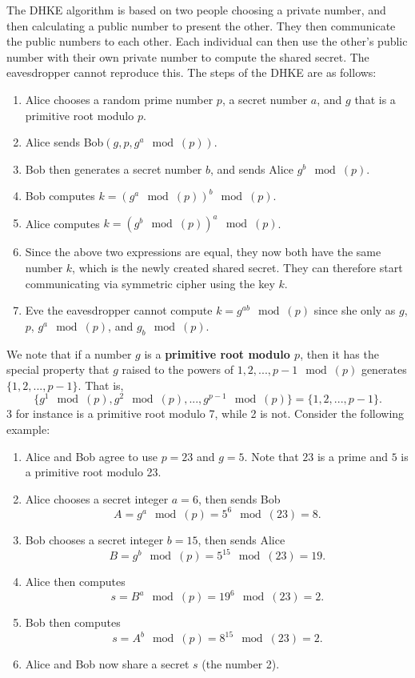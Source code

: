 \documentclass[11pt]{article}
\theoremstyle{plain} %
\theoremstyle{definition}
\theoremstyle{example}
\theoremstyle{remark}
\begin{document}
The DHKE algorithm is based on two people choosing a private number, and then calculating a public number to present the other. They then communicate the public numbers to each other. Each individual can then use the other's  public number with their own private number to compute the shared secret. The eavesdropper cannot reproduce this. The steps of the DHKE are as follows:
\begin{enumerate}
	\item Alice chooses a random prime number $p$, a secret number $a$, and $g$ that is a primitive root modulo $p$. 
	\item Alice sends Bob$ \left(g, p, g^a\mod(p)\right)$. 
	\item Bob then generates a secret number $b$, and sends Alice $g^b\mod(p)$. 
	\item Bob computes $k = \left(g^a\mod(p)\right)^b\mod(p)$.
	\item Alice computes $k = \left(g^b\mod(p)\right)^a\mod(p)$. 
	\item Since the above two expressions are equal, they now both have the same number $k$, which is the newly created shared secret. They can therefore start communicating via symmetric cipher using the key $k$. 
	\item Eve the eavesdropper cannot compute $k= g^{ab}\mod(p)$ since she only as $g$, $p$, $g^a\mod(p)$, and $g_b\mod(p)$. 
\end{enumerate}

We note that if a number $g$ is a \textbf{primitive root modulo $p$}, then it has the special property that $g$ raised to the powers of $1, 2, ..., p-1 \mod(p)$ generates $\{1, 2, ..., p-1\}$. That is, 
$$\{g^1\mod(p), g^2\mod(p) , ..., g^{p-1}\mod(p)\} = \{1, 2, ..., p-1\}.$$
3 for instance is a primitive root modulo 7, while 2 is not. Consider the following example:
\begin{enumerate}
	\item Alice and Bob agree to use $p = 23$ and $g = 5$. Note that $23$ is a prime and $5$ is a primitive root modulo 23. 
	\item Alice chooses a secret integer $a=6$, then sends Bob 
	$$A = g^a\mod(p) = 5^6\mod(23) = 8.$$
	\item Bob chooses a secret integer $b = 15$, then sends Alice 
	$$B = g^b\mod(p) = 5^{15}\mod(23) = 19.$$
	\item Alice then computes $$s = B^a\mod(p) = 19^6\mod(23) = 2.$$
	\item Bob then computes $$s = A^b\mod(p) = 8^{15}\mod(23) = 2.$$
	\item Alice and Bob now share a secret $s$ (the number 2). 
\end{enumerate}
\end{document}
